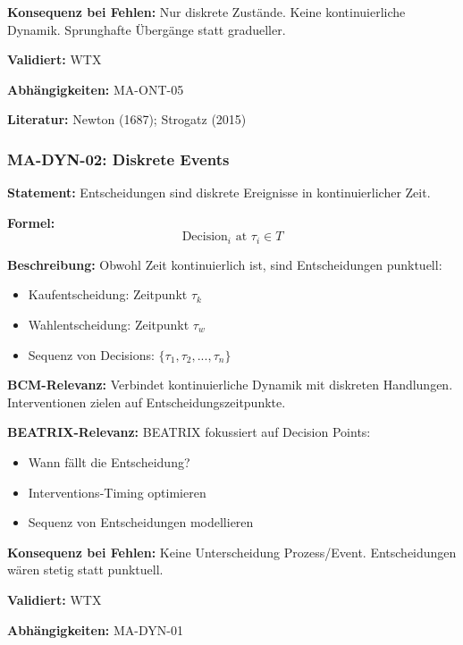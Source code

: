 \textbf{Konsequenz bei Fehlen:}
Nur diskrete Zustände. Keine kontinuierliche Dynamik. Sprunghafte Übergänge statt gradueller.

\textbf{Validiert:} WTX

\textbf{Abhängigkeiten:} MA-ONT-05

\textbf{Literatur:} Newton (1687); Strogatz (2015)


\subsubsection*{MA-DYN-02: Diskrete Events}

\textbf{Statement:} Entscheidungen sind diskrete Ereignisse in kontinuierlicher Zeit.

\textbf{Formel:}
\begin{equation}
\text{Decision}_i \text{ at } \tau_i \in T
\end{equation}

\textbf{Beschreibung:}
Obwohl Zeit kontinuierlich ist, sind Entscheidungen punktuell:
\begin{itemize}
    \item Kaufentscheidung: Zeitpunkt $\tau_k$
    \item Wahlentscheidung: Zeitpunkt $\tau_w$
    \item Sequenz von Decisions: $\{\tau_1, \tau_2, ..., \tau_n\}$
\end{itemize}

\textbf{BCM-Relevanz:}
Verbindet kontinuierliche Dynamik mit diskreten Handlungen. Interventionen zielen auf Entscheidungszeitpunkte.

\textbf{BEATRIX-Relevanz:}
BEATRIX fokussiert auf Decision Points:
\begin{itemize}
    \item Wann fällt die Entscheidung?
    \item Interventions-Timing optimieren
    \item Sequenz von Entscheidungen modellieren
\end{itemize}

\textbf{Konsequenz bei Fehlen:}
Keine Unterscheidung Prozess/Event. Entscheidungen wären stetig statt punktuell.

\textbf{Validiert:} WTX

\textbf{Abhängigkeiten:} MA-DYN-01

